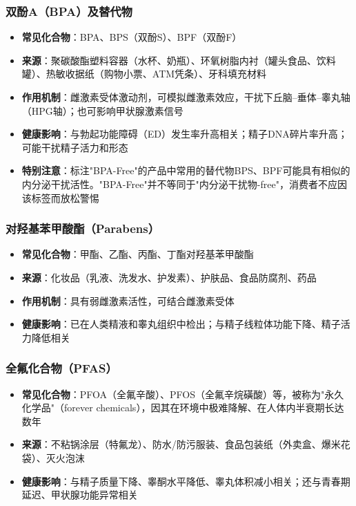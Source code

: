 \begin{enumerate}
\subsubsection{双酚A（BPA）及替代物}

\begin{itemize}[leftmargin=2cm]
	\item \textbf{常见化合物}：BPA、BPS（双酚S）、BPF（双酚F）
	\item \textbf{来源}：聚碳酸酯塑料容器（水杯、奶瓶）、环氧树脂内衬（罐头食品、饮料罐）、热敏收据纸（购物小票、ATM凭条）、牙科填充材料
	\item \textbf{作用机制}：雌激素受体激动剂，可模拟雌激素效应，干扰下丘脑--垂体--睾丸轴（HPG轴）；也可影响甲状腺激素信号
	\item \textbf{健康影响}：与勃起功能障碍（ED）发生率升高相关；精子DNA碎片率升高；可能干扰精子活力和形态
	\item \textbf{特别注意}：标注"BPA-Free"的产品中常用的替代物BPS、BPF可能具有相似的内分泌干扰活性。"BPA-Free"并不等同于"内分泌干扰物-free"，消费者不应因该标签而放松警惕
\end{itemize}

\subsubsection{对羟基苯甲酸酯（Parabens）}

\begin{itemize}[leftmargin=2cm]
	\item \textbf{常见化合物}：甲酯、乙酯、丙酯、丁酯对羟基苯甲酸酯
	\item \textbf{来源}：化妆品（乳液、洗发水、护发素）、护肤品、食品防腐剂、药品
	\item \textbf{作用机制}：具有弱雌激素活性，可结合雌激素受体
	\item \textbf{健康影响}：已在人类精液和睾丸组织中检出；与精子线粒体功能下降、精子活力降低相关
\end{itemize}

\subsubsection{全氟化合物（PFAS）}

\begin{itemize}[leftmargin=2cm]
	\item \textbf{常见化合物}：PFOA（全氟辛酸）、PFOS（全氟辛烷磺酸）等，被称为"永久化学品"（forever chemicals），因其在环境中极难降解、在人体内半衰期长达数年
	\item \textbf{来源}：不粘锅涂层（特氟龙）、防水/防污服装、食品包装纸（外卖盒、爆米花袋）、灭火泡沫
	\item \textbf{健康影响}：与精子质量下降、睾酮水平降低、睾丸体积减小相关；还与青春期延迟、甲状腺功能异常相关
\end{itemize}


\end{enumerate}
